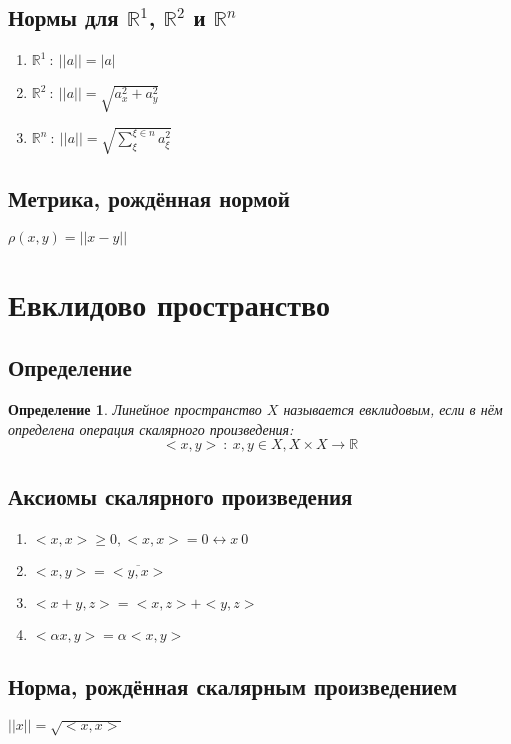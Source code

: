 \documentclass[a4paper, 12pt, titlepage]{article}
\newtheorem{Def}{Определение}[section]
\newcommand{\Real}{\mathbb{R}}
\begin{document}
		\subsection{Нормы для $\mathbb{R}^1$, $\mathbb{R}^2$ и $\mathbb{R}^n$}
			\begin{enumerate}
				\item $\Real^1 \:\colon\: ||a|| = |a|$
				\item $\Real^2 \:\colon\: ||a|| = \sqrt{a_x^2 + a_y^2}$
				\item $\Real^n \:\colon\: ||a|| = \sqrt{\sum_{\xi}^{\xi \in n} a_\xi^2}$
			\end{enumerate}
		\subsection{Метрика, рождённая нормой}
		$\rho(x, y) = ||x - y||$
	\section{Евклидово пространство}
		\subsection{Определение}
			\begin{Def}
				Линейное пространство $X$ называется евклидовым, если в нём определена операция скалярного произведения:
				\[<\!\!x, y\!\!> \:\colon\: x, y \in X, X \times X \to \Real\]
			\end{Def}
		\subsection{Аксиомы скалярного произведения}
			\begin{enumerate}
				\item $<\!\!x, x\!\!> \ge 0, <\!\!x, x\!\!> = 0 \leftrightarrow x \ 0$
				\item $<\!\!x, y\!\!> = \overline{<\!\!y, x\!\!>}$
				\item $<\!\!x + y, z\!\!> = <\!\!x, z\!\!> + <\!\!y, z\!\!>$
				\item $<\!\!\alpha x, y\!\!> = \alpha <\!\!x, y\!\!>$
			\end{enumerate}
		\subsection{Норма, рождённая скалярным произведением}
		$||x|| = \sqrt{<\!\!x, x\!\!>}$
\end{document}
